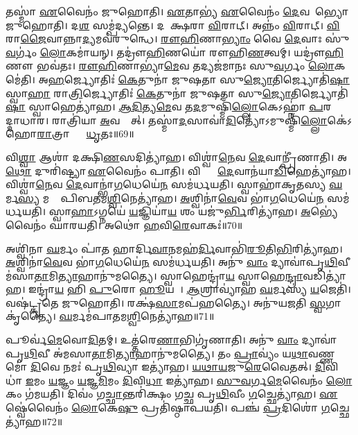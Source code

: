 𑌤𑌸𑍍𑌮𑌾॑ \ul{𑌏}𑌵𑍈𑌨𑌂॑ 𑌜𑍁𑌹𑍋𑌤𑌿। 
\ul{𑌏}𑌤𑌾𑌭𑍍𑌯॑ \ul{𑌏}𑌵𑍈𑌨𑌂॑ \ul{𑌦𑍇}𑌵𑌤𑌾᳚𑌭𑍍𑌯𑍋 𑌜𑍁𑌹𑍋𑌤𑌿। 
𑌦\ul{𑌶} 𑌸𑌮𑍍𑌪॑𑌦𑍍𑌯𑌨𑍍𑌤𑍇। 
𑌦𑌶𑌾᳚𑌕𑍍𑌷𑌰𑌾 \ul{𑌵𑌿}𑌰𑌾𑌟𑍍। 
𑌅𑌨𑍍𑌨𑌂॑  \ul{𑌵𑌿}𑌰𑌾𑌟𑍍। 
\ul{𑌵𑌿}𑌰𑌾\ul{𑌜𑍈}𑌵𑌾𑌨𑍍𑌨𑌾\ul{𑌦𑍍𑌯}𑌮𑌵॑𑌰𑍁𑌨𑍍𑌧𑍇। 
\ul{𑌰𑍗}\ul{𑌹𑌿}𑌣𑌾\ul{𑌭𑍍𑌯𑌾𑌂} 𑌵𑍈 \ul{𑌦𑍇}𑌵𑌾𑌃 𑌸𑍁॑\ul{𑌵}𑌰𑍍𑌗𑌂॑ \ul{𑌲𑍋}𑌕𑌮𑌾॑𑌯𑌨𑍍। 
𑌤𑌦𑍍𑌰𑍗॑\ul{𑌹𑌿}𑌣𑌯𑍋॑ 𑌰𑍗𑌹𑌿\ul{𑌣}𑌤𑍍𑌵𑌮𑍍। 
𑌯𑌦𑍍𑌰𑍗॑\ul{𑌹𑌿}𑌣𑍗 𑌭𑌵॑𑌤𑌃। 
\ul{𑌰𑍗}\ul{𑌹𑌿}𑌣𑌾𑌭𑍍𑌯𑌾॑\ul{𑌮𑍇}𑌵 𑌤𑌦𑍍𑌯𑌜॑𑌮𑌾𑌨𑌃 𑌸𑍁\ul{𑌵}𑌰𑍍𑌗𑌂 \ul{𑌲𑍋}𑌕𑌮𑍇॑𑌤𑌿। 
𑌅\ul{𑌹}𑌰𑍍𑌜𑍍𑌯𑍋𑌤𑌿𑌃॑ \ul{𑌕𑍇}𑌤𑍁𑌨𑌾॑ 𑌜𑍁𑌷𑌤𑌾 𑌸𑍁\ul{𑌜𑍍𑌯𑍋}𑌤𑌿𑌰𑍍𑌜𑍍𑌯𑍋𑌤𑌿॑\ul{𑌷𑌾}\ul{} 𑌸𑍍𑌵𑌾\ul{𑌹𑌾} 𑌰𑌾\ul{𑌤𑍍𑌰𑌿}𑌰𑍍𑌜𑍍𑌯𑍋𑌤𑌿𑌃॑ \ul{𑌕𑍇}𑌤𑍁𑌨𑌾॑ 𑌜𑍁𑌷𑌤𑌾 𑌸𑍁\ul{𑌜𑍍𑌯𑍋}𑌤𑌿𑌰𑍍𑌜𑍍𑌯𑍋𑌤𑌿॑\ul{𑌷𑌾}\ul{} 𑌸𑍍𑌵𑌾𑌹𑍇𑌤𑍍𑌯𑌾॑𑌹। 
\ul{𑌆}\ul{𑌦𑌿}𑌤𑍍𑌯\ul{𑌮𑍇}𑌵 𑌤\ul{𑌦}𑌮𑍁𑌷𑍍𑌮𑌿𑌁॑\ul{𑌲𑍍𑌲𑍋}𑌕𑍇𑌽𑌹𑍍𑌨𑌾॑ \ul{𑌪}𑌰𑌸𑍍𑌤𑌾᳚𑌦𑍍𑌦𑌾𑌧𑌾𑌰। 
𑌰𑌾𑌤𑍍𑌰𑌿॑𑌯𑌾 \ul{𑌅}𑌵𑌸𑍍𑌤𑌾᳚𑌤𑍍। 
𑌤𑌸𑍍𑌮𑌾॑\ul{𑌦}𑌸𑌾𑌵𑌾॑\ul{𑌦𑌿}𑌤𑍍𑌯𑍋॑𑌽𑌮𑍁𑌷𑍍𑌮𑌿𑌁॑\ul{𑌲𑍍𑌲𑍋}𑌕𑍇॑𑌽𑌹𑍋\ul{𑌰𑌾}𑌤𑍍𑌰𑌾𑌭𑍍𑌯𑌾𑌂᳚ \ul{𑌧𑍃}𑌤𑌃॥69॥

𑌵𑌿\ul{𑌶𑍍𑌵𑌾} 𑌆𑌶𑌾॑ 𑌦𑌕𑍍𑌷𑌿\ul{𑌣}𑌸𑌦𑌿𑌤𑍍𑌯𑌾॑𑌹। 
𑌵𑌿𑌶𑍍𑌵𑌾॑\ul{𑌨𑍇}𑌵 \ul{𑌦𑍇}𑌵𑌾𑌨𑍍𑌪𑍍𑌰𑍀॑𑌣𑌾𑌤𑌿। 
𑌅\ul{𑌥𑍋} 𑌦𑍁𑌰𑌿॑𑌷𑍍𑌟𑍍𑌯𑌾 \ul{𑌏}𑌵𑍈𑌨𑌂॑ 𑌪𑌾𑌤𑌿। 
𑌵𑌿𑌶𑍍𑌵𑌾𑌂᳚ \ul{𑌦𑍇}𑌵𑌾𑌨॑𑌯𑌾\ul{𑌡𑌿}𑌹𑍇𑌤𑍍𑌯𑌾॑𑌹। 
𑌵𑌿𑌶𑍍𑌵𑌾॑\ul{𑌨𑍇}𑌵 \ul{𑌦𑍇}𑌵𑌾𑌨𑍍𑌭𑌾॑\ul{𑌗}𑌧𑍇𑌯𑍇॑\ul{𑌨} 𑌸𑌮॑𑌰𑍍𑌧𑌯𑌤𑌿। 
𑌸𑍍𑌵𑌾𑌹𑌾॑𑌕𑍃𑌤𑌸𑍍𑌯 \ul{𑌘}𑌰𑍍𑌮\ul{𑌸𑍍𑌯} 𑌮𑌧𑍋𑌃᳚ 𑌪𑌿𑌬𑌤𑌮\ul{𑌶𑍍𑌵𑌿}𑌨𑍇𑌤𑍍𑌯𑌾॑𑌹। 
\ul{𑌅}𑌶𑍍𑌵𑌿𑌨𑌾॑\ul{𑌵𑍇}𑌵 𑌭𑌾॑\ul{𑌗}𑌧𑍇𑌯𑍇॑\ul{𑌨} 𑌸𑌮॑𑌰𑍍𑌧𑌯𑌤𑌿। 
𑌸𑍍𑌵𑌾\ul{𑌹𑌾}𑌽𑌗𑍍𑌨𑌯𑍇॑ \ul{𑌯}𑌜𑍍𑌞𑌿𑌯𑌾॑\ul{𑌯} 𑌶𑌂 𑌯𑌜𑍁॑\ul{𑌰𑍍𑌭𑌿}𑌰𑌿𑌤𑍍𑌯𑌾॑𑌹। 
\ul{𑌅}𑌭𑍍𑌯𑍇॑𑌵𑍈𑌨𑌂॑ 𑌘𑌾𑌰𑌯𑌤𑌿। 
𑌅𑌥𑍋॑ \ul{𑌹}𑌵𑌿\ul{𑌰𑍇}𑌵𑌾𑌕𑌃॑॥70॥

𑌅𑌶𑍍𑌵𑌿॑𑌨𑌾 \ul{𑌘}𑌰𑍍𑌮𑌂 𑌪𑌾॑𑌤 𑌹𑌾𑌰𑍍𑌦𑌿\ul{𑌵𑌾}𑌨𑌮𑌹॑\ul{𑌰𑍍𑌦𑌿}𑌵𑌾𑌭𑌿॑\ul{𑌰𑍂}𑌤𑌿\ul{𑌭𑌿}𑌰𑌿𑌤𑍍𑌯𑌾॑𑌹। 
\ul{𑌅}𑌶𑍍𑌵𑌿𑌨𑌾॑\ul{𑌵𑍇}𑌵 𑌭𑌾॑\ul{𑌗}𑌧𑍇𑌯𑍇॑\ul{𑌨} 𑌸𑌮॑𑌰𑍍𑌧𑌯𑌤𑌿। 
𑌅𑌨𑍁॑ \ul{𑌵𑌾𑌂} 𑌦𑍍𑌯𑌾𑌵𑌾॑𑌪𑍃\ul{𑌥𑌿}𑌵𑍀 𑌮॑𑌸𑌾\ul{𑌤𑌾}𑌮𑌿\ul{𑌤𑍍𑌯𑌾}𑌹𑌾𑌨𑍁॑𑌮𑌤𑍍𑌯𑍈। 
𑌸𑍍𑌵𑌾𑌹𑍇𑌨𑍍𑌦𑍍𑌰𑌾॑\ul{𑌯} 𑌸𑍍𑌵𑌾𑌹𑍇\ul{𑌨𑍍𑌦𑍍𑌰𑌾}𑌵𑌡𑌿𑌤𑍍𑌯𑌾॑𑌹। 
𑌇𑌨𑍍𑌦𑍍𑌰𑌾॑\ul{𑌯} 𑌹𑌿 \ul{𑌪𑍁}𑌰𑍋 \ul{𑌹𑍂}𑌯𑌤𑍇᳚। 
\ul{𑌆}𑌶𑍍𑌰𑌾𑌵𑍍𑌯𑌾॑𑌹 \ul{𑌘}𑌰𑍍𑌮𑌸𑍍𑌯॑ \ul{𑌯}𑌜𑍇𑌤𑌿॑। 
𑌵𑌷॑𑌟𑍍𑌕𑍃𑌤𑍇 𑌜𑍁𑌹𑍋𑌤𑌿। 
𑌰𑌕𑍍𑌷॑\ul{𑌸𑌾}𑌮𑌪॑𑌹𑌤𑍍𑌯𑍈। 
𑌅𑌨𑍁॑𑌯𑌜𑌤𑌿 \ul{𑌸𑍍𑌵}𑌗𑌾𑌕𑍃॑𑌤𑍍𑌯𑍈। 
\ul{𑌘}𑌰𑍍𑌮𑌮॑𑌪𑌾𑌤𑌮\ul{𑌶𑍍𑌵𑌿}𑌨𑍇𑌤𑍍𑌯𑌾॑𑌹॥71॥

𑌪𑍂𑌰𑍍𑌵॑\ul{𑌮𑍇}𑌵𑍋\ul{𑌦𑌿}𑌤𑌮𑍍। 
𑌉𑌤𑍍𑌤॑𑌰𑍇\ul{𑌣𑌾}𑌭𑌿𑌗𑍃॑𑌣𑌾𑌤𑌿। 
𑌅𑌨𑍁॑ \ul{𑌵𑌾𑌂} 𑌦𑍍𑌯𑌾𑌵𑌾॑𑌪𑍃\ul{𑌥𑌿}𑌵𑍀 𑌅॑𑌮𑌸𑌾\ul{𑌤𑌾}𑌮𑌿\ul{𑌤𑍍𑌯𑌾}𑌹𑌾𑌨𑍁॑𑌮𑌤𑍍𑌯𑍈। 
𑌤𑌂 \ul{𑌪𑍍𑌰𑌾}𑌵𑍍𑌯𑌂॑ 𑌯\ul{𑌥𑌾}𑌵𑌣𑍍𑌣𑌮𑍋॑ \ul{𑌦𑌿}𑌵𑍇 𑌨𑌮𑌃॑ 𑌪𑍃\ul{𑌥𑌿}𑌵𑍍𑌯𑌾 𑌇𑌤𑍍𑌯𑌾॑𑌹। 
\ul{𑌯}\ul{𑌥𑌾}\ul{𑌯}𑌜𑍁\ul{𑌰𑍇}𑌵𑍈𑌤𑌤𑍍। 
\ul{𑌦𑌿}𑌵𑌿𑌧𑌾॑ \ul{𑌇}𑌮𑌂 \ul{𑌯}𑌜𑍍𑌞𑌂 \ul{𑌯}𑌜𑍍𑌞\ul{𑌮𑌿}𑌮𑌂 \ul{𑌦𑌿}𑌵𑌿\ul{𑌧𑌾} 𑌇𑌤𑍍𑌯𑌾॑𑌹। 
\ul{𑌸𑍁}\ul{𑌵}𑌰𑍍𑌗\ul{𑌮𑍇}𑌵𑍈𑌨𑌂॑ \ul{𑌲𑍋}𑌕𑌂 𑌗॑𑌮𑌯𑌤𑌿। 
𑌦𑌿𑌵𑌂॑ 𑌗\ul{𑌚𑍍𑌛𑌾}𑌨𑍍𑌤𑌰𑌿॑𑌕𑍍𑌷𑌂 𑌗𑌚𑍍𑌛 𑌪𑍃\ul{𑌥𑌿}𑌵𑍀𑌂 \ul{𑌗}𑌚𑍍𑌛𑍇𑌤𑍍𑌯𑌾॑𑌹। 
\ul{𑌏}𑌷𑍍𑌵𑍇॑𑌵𑍈𑌨𑌂॑ \ul{𑌲𑍋}𑌕𑍇\ul{𑌷𑍁} 𑌪𑍍𑌰𑌤𑌿॑𑌷𑍍𑌠𑌾𑌪𑌯𑌤𑌿। 
𑌪𑌞𑍍𑌚॑ \ul{𑌪𑍍𑌰}𑌦𑌿𑌶𑍋॑ \ul{𑌗}𑌚𑍍𑌛𑍇𑌤𑍍𑌯𑌾॑𑌹॥72॥

